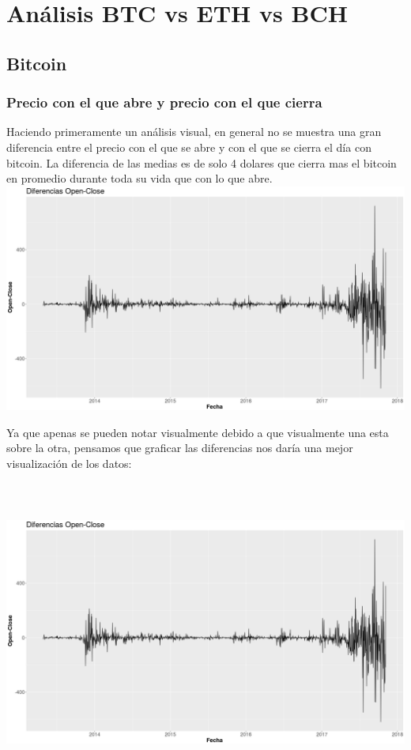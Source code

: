 \documentclass[12pt,letterpaper]{article}
\begin{document}
\section*{An\'alisis BTC vs ETH vs BCH}

    \subsection*{Bitcoin}

    \subsubsection*{Precio con el que abre y precio con el que cierra}

    Haciendo primeramente un an\'alisis visual, en general no se muestra una gran diferencia entre el precio con el que se abre y con el que se cierra el día con bitcoin. La diferencia de las medias es de solo 4 dolares que cierra mas el bitcoin en promedio durante toda su vida que con lo que abre.
    \\
    
    \includegraphics{btc/diferencias_BTC_OpenClose}

    Ya que apenas se pueden notar visualmente debido a que visualmente una esta sobre la otra, pensamos que graficar las diferencias nos dar\'ia una mejor visualizaci\'on de los datos:

    \includegraphics[width = 18cm, height = 10cm]{btc/diferencias_BTC_OpenClose}
\end{document}
